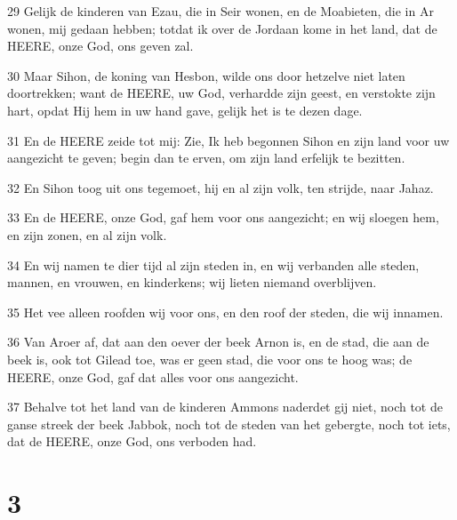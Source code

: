 \par 29 Gelijk de kinderen van Ezau, die in Seir wonen, en de Moabieten, die in Ar wonen, mij gedaan hebben; totdat ik over de Jordaan kome in het land, dat de HEERE, onze God, ons geven zal.
\par 30 Maar Sihon, de koning van Hesbon, wilde ons door hetzelve niet laten doortrekken; want de HEERE, uw God, verhardde zijn geest, en verstokte zijn hart, opdat Hij hem in uw hand gave, gelijk het is te dezen dage.
\par 31 En de HEERE zeide tot mij: Zie, Ik heb begonnen Sihon en zijn land voor uw aangezicht te geven; begin dan te erven, om zijn land erfelijk te bezitten.
\par 32 En Sihon toog uit ons tegemoet, hij en al zijn volk, ten strijde, naar Jahaz.
\par 33 En de HEERE, onze God, gaf hem voor ons aangezicht; en wij sloegen hem, en zijn zonen, en al zijn volk.
\par 34 En wij namen te dier tijd al zijn steden in, en wij verbanden alle steden, mannen, en vrouwen, en kinderkens; wij lieten niemand overblijven.
\par 35 Het vee alleen roofden wij voor ons, en den roof der steden, die wij innamen.
\par 36 Van Aroer af, dat aan den oever der beek Arnon is, en de stad, die aan de beek is, ook tot Gilead toe, was er geen stad, die voor ons te hoog was; de HEERE, onze God, gaf dat alles voor ons aangezicht.
\par 37 Behalve tot het land van de kinderen Ammons naderdet gij niet, noch tot de ganse streek der beek Jabbok, noch tot de steden van het gebergte, noch tot iets, dat de HEERE, onze God, ons verboden had.

\chapter{3}

